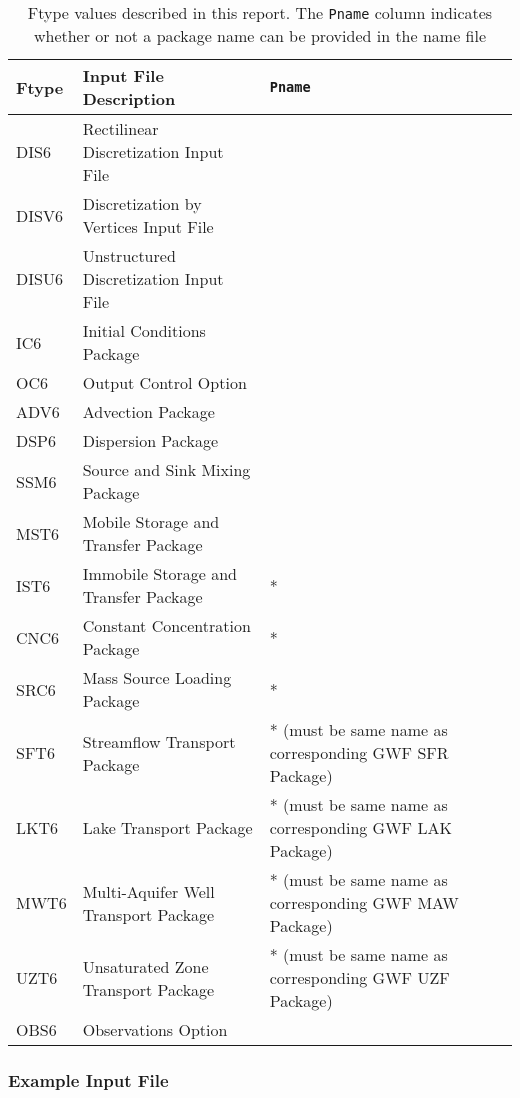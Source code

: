 \begin{table}[H]
\caption{Ftype values described in this report.  The \texttt{Pname} column indicates whether or not a package name can be provided in the name file}
\small
\begin{center}
\begin{tabular*}{\columnwidth}{l l l}
\hline
\hline
Ftype & Input File Description & \texttt{Pname}\\
\hline
DIS6 & Rectilinear Discretization Input File \\
DISV6 & Discretization by Vertices Input File \\
DISU6 & Unstructured Discretization Input File \\
IC6 & Initial Conditions Package \\
OC6 & Output Control Option \\
ADV6 & Advection Package \\ 
DSP6 & Dispersion Package \\ 
SSM6 & Source and Sink Mixing Package \\ 
MST6 & Mobile Storage and Transfer Package \\
IST6 & Immobile Storage and Transfer Package & * \\
CNC6 & Constant Concentration Package & *\\ 
SRC6 & Mass Source Loading Package & * \\ 
SFT6 & Streamflow Transport Package & * (must be same name as corresponding GWF SFR Package) \\ 
LKT6 & Lake Transport Package & * (must be same name as corresponding GWF LAK Package) \\ 
MWT6 & Multi-Aquifer Well Transport Package & * (must be same name as corresponding GWF MAW Package) \\ 
UZT6 & Unsaturated Zone Transport Package & * (must be same name as corresponding GWF UZF Package) \\ 
OBS6 & Observations Option \\
\hline 
\end{tabular*}
\label{table:ftype}
\end{center}
\normalsize
\end{table}

\vspace{5mm}
\subsubsection{Example Input File}


